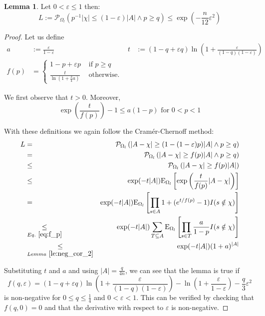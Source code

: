 \documentclass{article}
\newcommand{\prob}{\mathcal P}
\newcommand{\expectation}{\mathrm{E}}
\newcommand{\eps}{\varepsilon}
\theoremstyle{definition}
\newtheorem{lemma}{Lemma}
\begin{document}
\begin{lemma}\label{le:lower_tail}
Let $0 < \eps \leq 1$ then:
\[
  L := \prob_{\Omega_l} ( p^{-1} |\chi| \leq (1-\eps)|A| \wedge p \geq q) \leq \exp\left(-\frac{n}{12} \eps^2\right)
\]
\end{lemma}
\begin{proof}
Let us define 
\begin{align*}
  a & := \frac{\eps}{1-\eps} &
  t & := (1-q+\eps q) \ln \left(1 + \frac{\eps}{(1-q)(1-\eps)} \right) \\
  f(p) & = \begin{cases} 1-p+\eps p & \textrm{ if } p \geq q \\ \frac{t}{\ln \left(1+\frac{3}{4}a\right)} & \textrm{ otherwise.} \end{cases}
\end{align*}

We first observe that $t > 0$. Moreover, 
\begin{equation}\label{eq:f_p}
  \exp\left( \frac{t}{f(p)}\right)-1 \leq a (1-p) \textrm{ for } 0 < p < 1  
\end{equation}

With these definitions we again follow the Cram\'{e}r-Chernoff method: 
{\allowdisplaybreaks
\begin{eqnarray*}
  L & = & \prob_{\Omega_l} \left( |A-\chi| \geq (1-(1-\eps)p) |A| \wedge p \geq q \right) \\
    & = & \prob_{\Omega_l} \left( |A-\chi| \geq f(p)|A| \wedge p \geq q \right) \\
    & \leq & \prob_{\Omega_l} \left( |A-\chi| \geq f(p)|A| \right)  \\
    & \leq & \exp( -t |A| ) \expectation_{\Omega_l} \left[ \exp \left( \frac{t}{f(p)} |A-\chi| \right) \right] \\
    & = & \exp( -t |A| ) \expectation_{\Omega_l} \left[ \prod_{s \in A} 1 + (e^{t/f(p)} - 1) I(s \notin \chi) \right] \\
    & \underset{Eq.~\ref{eq:f_p}}{\leq}  & \exp( -t |A| ) \sum_{T \subseteq A} \expectation_{\Omega_l} \left[ \prod_{s \in T} \frac{a}{1-p} I(s \notin \chi) \right] \\
    & \underset{Lemma~\ref{le:neg_cor_2}}{\leq} & \exp( -t |A| ) (1+a)^{|A|}
\end{eqnarray*}
}

Substituting $t$ and $a$ and using $|A| = \frac{q}{4n}$, we can see that the lemma is true if
\[
  f(q,\eps) = (1-q+\eps q) \ln\left(1+\frac{\eps}{(1-q)(1-\eps)}\right) - \ln\left(1+\frac{\eps}{1-\eps}\right) - \frac{q}{3} \eps^2
\]
is non-negative for $0 \leq q \leq \frac{1}{4}$ and $0 < \eps < 1$.
This can be verified by checking that $f(q,0) = 0$ and that the derivative with respect to $\eps$ is non-negative.
\end{proof}
\end{document}
